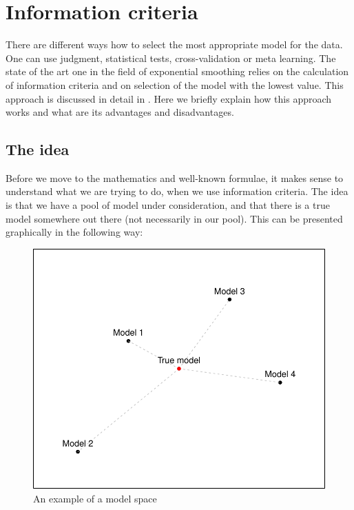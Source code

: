 \documentclass[
]{book}
\theoremstyle{definition}
\theoremstyle{definition}
\theoremstyle{definition}
\theoremstyle{definition}
\theoremstyle{remark}
\begin{document}
\section{Information criteria}\label{informationCriteria}

There are different ways how to select the most appropriate model for the data. One can use judgment, statistical tests, cross-validation or meta learning. The state of the art one in the field of exponential smoothing relies on the calculation of information criteria and on selection of the model with the lowest value. This approach is discussed in detail in \citet{Burnham2004}. Here we briefly explain how this approach works and what are its advantages and disadvantages.

\subsection{The idea}\label{informationCriteriaIdea}

Before we move to the mathematics and well-known formulae, it makes sense to understand what we are trying to do, when we use information criteria. The idea is that we have a pool of model under consideration, and that there is a true model somewhere out there (not necessarily in our pool). This can be presented graphically in the following way:

\begin{figure}
\centering
\includegraphics{Svetunkov---Statistics-for-Business-Analytics_files/figure-latex/AICModelsPlot-1.pdf}
\caption{\label{fig:AICModelsPlot}An example of a model space}
\end{figure}
\end{document}
